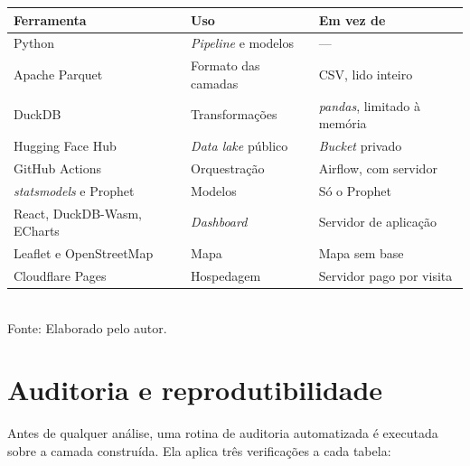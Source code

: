 \begin{quadro}[htbp]
    \centering
    \caption{Ferramentas utilizadas e justificativa da escolha}
    \label{quadro:ferramentas}
    \footnotesize
    \renewcommand{\arraystretch}{1.25}
    \begin{tabularx}{\textwidth}{%
        >{\raggedright\arraybackslash\hsize=1.15\hsize}X
        >{\raggedright\arraybackslash\hsize=0.85\hsize}X
        >{\raggedright\arraybackslash\hsize=1.00\hsize}X}
        \toprule
        \rowcolor{black!8}
        \textbf{Ferramenta} & \textbf{Uso} & \textbf{Em vez de} \\
        \midrule
        Python \cite{Python2024} & \textit{Pipeline} e modelos & --- \\ \addlinespace[4pt]
        Apache Parquet \cite{ApacheParquet2024} & Formato das camadas & CSV, lido inteiro \\ \addlinespace[4pt]
        DuckDB \cite{DuckDB2024, Raasveldt2019} & Transformações & \textit{pandas}, limitado à memória \\ \addlinespace[4pt]
        Hugging Face Hub \cite{HuggingFaceDatasets2026} & \textit{Data lake} público & \textit{Bucket} privado \\ \addlinespace[4pt]
        GitHub Actions \cite{GitHubActions2026} & Orquestração & Airflow, com servidor \\ \addlinespace[4pt]
        \textit{statsmodels} e Prophet \cite{Seabold2010, Taylor2018} & Modelos & Só o Prophet \\ \addlinespace[4pt]
        React, DuckDB-Wasm, ECharts \cite{React2026, Kohn2022, Li2018} & \textit{Dashboard} & Servidor de aplicação \\ \addlinespace[4pt]
        Leaflet e OpenStreetMap \cite{Leaflet2026, OpenStreetMap2026} & Mapa & Mapa sem base \\ \addlinespace[4pt]
        Cloudflare Pages \cite{CloudflarePages2026} & Hospedagem & Servidor pago por visita \\
        \bottomrule
    \end{tabularx}
    \\[4pt]
    {\footnotesize Fonte: Elaborado pelo autor.}
\end{quadro}

\section{Auditoria e reprodutibilidade}
\label{sec:auditoria}

Antes de qualquer análise, uma rotina de auditoria automatizada é executada sobre a camada construída. Ela aplica três verificações a cada tabela:

